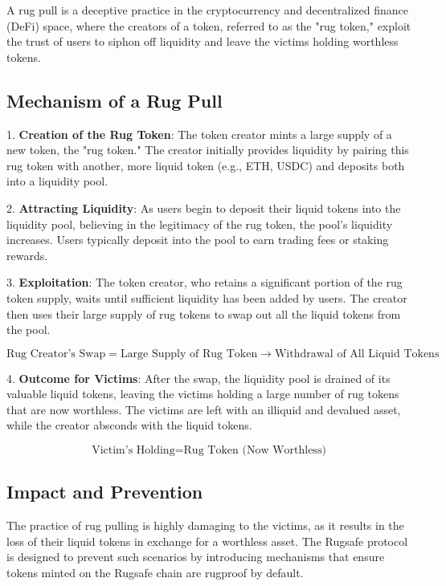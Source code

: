 \documentclass{article}
\begin{document}
A rug pull is a deceptive practice in the cryptocurrency and decentralized finance (DeFi) space, where the creators of a token, referred to as the "rug token," exploit the trust of users to siphon off liquidity and leave the victims holding worthless tokens.

\subsection{Mechanism of a Rug Pull}

1. \textbf{Creation of the Rug Token}: The token creator mints a large supply of a new token, the "rug token." The creator initially provides liquidity by pairing this rug token with another, more liquid token (e.g., ETH, USDC) and deposits both into a liquidity pool.

2. \textbf{Attracting Liquidity}: As users begin to deposit their liquid tokens into the liquidity pool, believing in the legitimacy of the rug token, the pool's liquidity increases. Users typically deposit into the pool to earn trading fees or staking rewards.

3. \textbf{Exploitation}: The token creator, who retains a significant portion of the rug token supply, waits until sufficient liquidity has been added by users. The creator then uses their large supply of rug tokens to swap out all the liquid tokens from the pool.

\[
\text{Rug Creator's Swap} = \text{Large Supply of Rug Token} \rightarrow \text{Withdrawal of All Liquid Tokens}
\]

4. \textbf{Outcome for Victims}: After the swap, the liquidity pool is drained of its valuable liquid tokens, leaving the victims holding a large number of rug tokens that are now worthless. The victims are left with an illiquid and devalued asset, while the creator absconds with the liquid tokens.

\[
\text{Victim's Holding} = \text{Rug Token (Now Worthless)}
\]

\subsection{Impact and Prevention}

The practice of rug pulling is highly damaging to the victims, as it results in the loss of their liquid tokens in exchange for a worthless asset. The Rugsafe protocol is designed to prevent such scenarios by introducing mechanisms that ensure tokens minted on the Rugsafe chain are rugproof by default.
\end{document}
